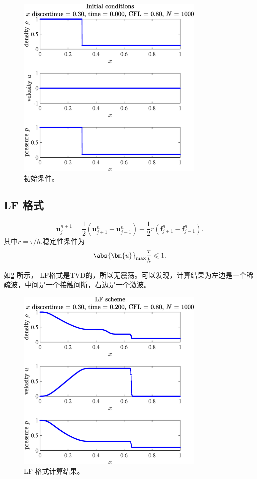 \documentclass[12pt]{article}
\begin{document}
\begin{figure}[htp]
	\centering
	\includegraphics[width=9cm]{2Initial_conditions.eps}
	\vspace{20pt}
	\caption{初始条件。}
	\label{fig:2ini}
\end{figure}

\subsection{LF 格式}

\begin{equation}
	\bm{u}^{n+1}_{j} = \frac{1}{2} \left( \bm{u}^{n}_{j+1} + \bm{u}^{n}_{j-1} \right) - \frac{1}{2} r \left( \bm{f}^{n}_{j+1} - \bm{f}^{n}_{j-1} \right).
\end{equation}
其中$r=\tau/h$,稳定性条件为
\begin{equation}
	\abs{\bm{u}}_{\max} \frac{\tau}{h} \leqslant 1.
\end{equation}

如\cref{fig:2LF} 所示， LF格式是TVD的，所以无震荡。可以发现，计算结果为左边是一个稀疏波，中间是一个接触间断，右边是一个激波。
\begin{figure}[htp]
	\centering
	\includegraphics[width=9cm]{2LF.eps}
	\vspace{20pt}
	\caption{LF 格式计算结果。}
	\label{fig:2LF}
\end{figure}
\end{document}
